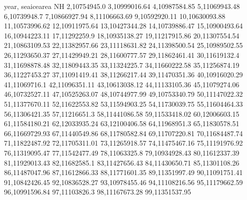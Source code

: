 year,    seaicearea NH
2,10754945.0
3,10999016.64
4,10987584.85
5,11069943.48
6,10739948.7
7,10866927.94
8,11106663.69
9,10592920.11
10,10630093.88
11,10573996.62
12,10911975.64
13,10427344.28
14,10739886.47
15,10900493.64
16,10944223.11
17,11292259.9
18,10935138.27
19,11217915.86
20,11307554.54
21,10863109.53
22,11382957.66
23,11118631.82
24,11398500.54
25,10989502.55
26,11293650.37
27,11429949.21
28,11600777.57
29,11862461.41
30,11619132.4
31,11698878.48
32,11809443.35
33,11324225.7
34,11660222.58
35,11256874.19
36,11227453.27
37,11091419.41
38,11266217.44
39,11470351.36
40,10916020.29
41,11069716.1
42,11096351.11
43,10613038.12
44,11133105.36
45,11079274.06
46,10732527.11
47,10525263.07
48,10744977.99
49,10753340.79
50,11147022.32
51,11377670.11
52,11622553.82
53,11594903.25
54,11730039.75
55,11604464.33
56,11306421.35
57,11216651.3
58,11441086.58
59,11533418.02
60,12006603.15
61,11584180.21
62,12033935.24
63,12100406.58
64,11968951.3
65,11830578.51
66,11669729.93
67,11440549.86
68,11780582.84
69,11707220.81
70,11684487.74
71,11822487.92
72,11705311.01
73,11265918.57
74,11475467.16
75,11191976.92
76,11319095.47
77,11542477.49
78,11063325.8
79,10934928.43
80,11612337.39
81,11929013.43
82,11682585.1
83,11427656.43
84,11430650.71
85,11301108.26
86,11487047.96
87,11612866.33
88,11771601.35
89,11351997.49
90,11091751.41
91,10842426.45
92,10836528.27
93,10978455.46
94,11108216.56
95,11179662.59
96,10991596.84
97,11103826.3
98,11167673.28
99,11351537.95
